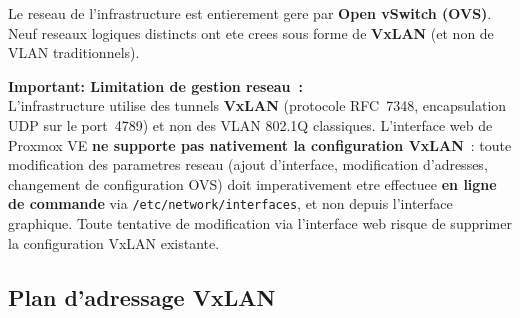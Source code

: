 \documentclass[a4paper,11pt]{article}
\newenvironment{warnbox}{%
  \begin{mdframed}[linecolor=orange,backgroundcolor=orange!8,linewidth=1pt,
    leftmargin=0pt,rightmargin=0pt,innertopmargin=6pt,innerbottommargin=6pt]
}{%
  \end{mdframed}
}
\begin{document}
Le reseau de l'infrastructure est entierement gere par \textbf{Open vSwitch (OVS)}.
Neuf reseaux logiques distincts ont ete crees sous forme de \textbf{VxLAN}
(et non de VLAN traditionnels).

\begin{warnbox}
  \textbf{Important: Limitation de gestion reseau~:}\\
  L'infrastructure utilise des tunnels \textbf{VxLAN} (protocole RFC~7348, encapsulation UDP
  sur le port~4789) et non des VLAN 802.1Q classiques. L'interface web de Proxmox VE
  \textbf{ne supporte pas nativement la configuration VxLAN}~: toute modification
  des parametres reseau (ajout d'interface, modification d'adresses, changement de
  configuration OVS) doit imperativement etre effectuee \textbf{en ligne de commande}
  via \texttt{/etc/network/interfaces}, et non depuis l'interface graphique.
  Toute tentative de modification via l'interface web risque de supprimer la
  configuration VxLAN existante.
\end{warnbox}

\subsection{Plan d'adressage VxLAN}
\end{document}
